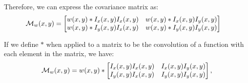 \begin{Answer}
  \step
  Therefore, we can express the covariance matrix as:
  \begin{align}
    \mathcal{M}_w(x,y) &= 
    \begin{bmatrix}
      w(x, y) \ast I_x(x,y)I_x(x,y) & w(x, y) \ast I_x(x,y)I_y(x,y)\\
      w(x, y) \ast I_y(x,y)I_x(x,y) & w(x, y) \ast I_y(x,y)I_y(x,y)
    \end{bmatrix}
  \end{align}

  \step
  If we define $\ast$ when applied to a matrix to be the convolution of
  a function with each element in the matrix, we have:
  \begin{equation}
    {\mathcal{M}}_w(x,y) = w(x,y)
      \ast
      \begin{bmatrix}
        I_x(x,y)I_x(x,y) & I_x(x,y)I_y(x,y)\\
        I_y(x,y)I_x(x,y) & I_y(x,y)I_y(x,y)
      \end{bmatrix},
  \end{equation}
\end{Answer}
